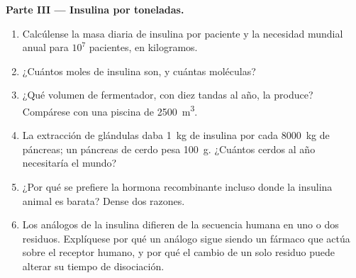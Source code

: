 \begin{problem}
\medskip
\noindent\textbf{Parte III --- Insulina por toneladas.}
\begin{enumerate}[resume]
  \item Calcúlense la masa diaria de insulina por paciente y la
        necesidad mundial anual para $10^{7}$ pacientes, en kilogramos.
  \item ¿Cuántos moles de insulina son, y cuántas moléculas?
  \item ¿Qué volumen de fermentador, con diez tandas al año, la produce?
        Compárese con una piscina de \qty{2500}{m^3}.
  \item La extracción de glándulas daba \qty{1}{kg} de insulina por cada
        \qty{8000}{kg} de páncreas; un páncreas de cerdo pesa
        \qty{100}{g}. ¿Cuántos cerdos al año necesitaría el mundo?
  \item ¿Por qué se prefiere la hormona recombinante incluso donde la
        insulina animal es barata? Dense dos razones.
  \item Los análogos de la insulina difieren de la secuencia humana en
        uno o dos residuos. Explíquese por qué un análogo sigue siendo
        un fármaco que actúa sobre el receptor humano, y por qué el
        cambio de un solo residuo puede alterar su tiempo de
        disociación.
\end{enumerate}


\end{problem}
